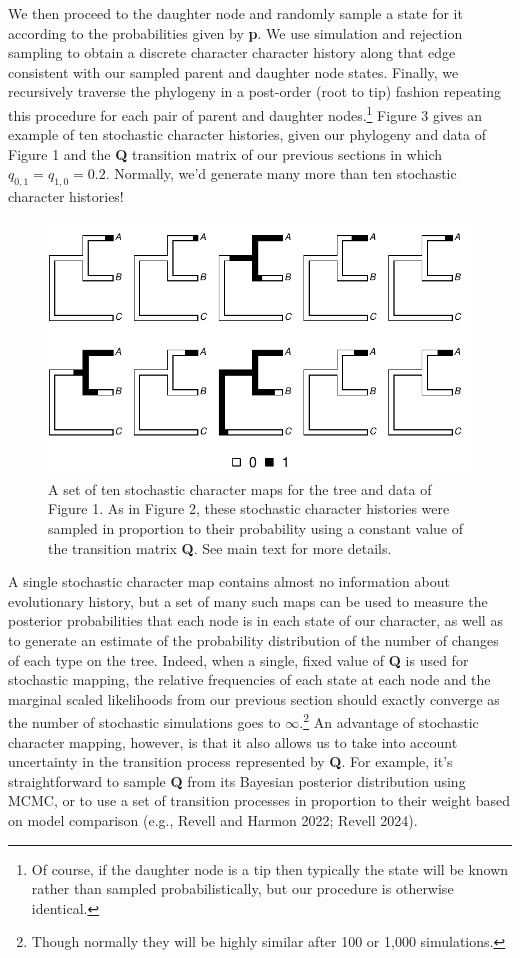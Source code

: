 \documentclass{article}
\begin{document}
We then proceed to the daughter node and randomly sample a state for it according to the probabilities given by \textbf{p}. We use simulation and rejection sampling to obtain a discrete character character history along that edge consistent with our sampled parent and daughter node states. Finally, we recursively traverse the phylogeny in a post-order (root to tip) fashion repeating this procedure for each pair of parent and daughter nodes.\footnote{Of course, if the daughter node is a tip then typically the state will be known rather than sampled probabilistically, but our procedure is otherwise identical.} Figure 3 gives an example of ten stochastic character histories, given our phylogeny and data of Figure 1 and the \textbf{Q} transition matrix of our previous sections in which \(q_{0,1} = q_{1,0} = 0.2\). Normally, we'd generate many more than ten stochastic character histories!

\begin{figure}
\centering
\includegraphics{Revell.AncestralReconstruction_files/figure-latex/fig3-1.pdf}
\caption{\label{fig:fig3}A set of ten stochastic character maps for the tree and data of Figure 1. As in Figure 2, these stochastic character histories were sampled in proportion to their probability using a constant value of the transition matrix \textbf{Q}. See main text for more details.}
\end{figure}

A single stochastic character map contains almost no information about evolutionary history, but a set of many such maps can be used to measure the posterior probabilities that each node is in each state of our character, as well as to generate an estimate of the probability distribution of the number of changes of each type on the tree. Indeed, when a single, fixed value of \textbf{Q} is used for stochastic mapping, the relative frequencies of each state at each node and the marginal scaled likelihoods from our previous section should exactly converge as the number of stochastic simulations goes to \(\infty\).\footnote{Though normally they will be highly similar after 100 or 1,000 simulations.} An advantage of stochastic character mapping, however, is that it also allows us to take into account uncertainty in the transition process represented by \textbf{Q}. For example, it's straightforward to sample \textbf{Q} from its Bayesian posterior distribution using MCMC, or to use a set of transition processes in proportion to their weight based on model comparison (e.g., Revell and Harmon 2022; Revell 2024).
\end{document}
